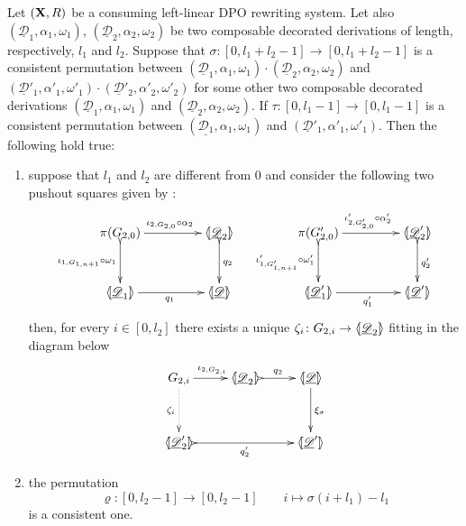 \documentclass[a4paper,UKenglish,cleveref,pdftex, thm-restate,numberwithinsect]{lipics}
\def\R{\mathsf{R}}
\def\X{\textbf {\textup{X}}}
\newcommand{\dder}[1]{\mathscr{#1}}
\newcommand{\der}[1]{\underline{\dder{#1}}}
\newcommand{\lpro}{\langle \hspace{-1.85pt}[}
\newcommand{\rpro}{]\hspace{-1.85pt}\rangle}
\newcommand{\tpro}[1]{\lpro \der{#1}\rpro}
\begin{document}
\begin{lemma}\label{lem:presuffix} Let $(\X, \R)$ be a consuming left-linear DPO rewriting system.  Let also $(\der{D}_1, \alpha_1, \omega_1)$, $(\der{D}_2, \alpha_2, \omega_2)$ be two composable decorated derivations of length, respectively, $l_1$ and $l_2$. Suppose that $\sigma\colon [0, l_1+l_2-1]\to [0, l_1+l_2-1]$ is a consistent permutation between $(\der{D}_1, \alpha_1, \omega_1)\cdot (\der{D}_2, \alpha_2, \omega_2)$ and $(\der{D}'_1, \alpha'_1, \omega'_1)\cdot (\der{D}'_2, \alpha'_2, \omega'_2)$ for some other two composable decorated derivations $(\der{D}_1, \alpha_1, \omega_1)$ and $(\der{D}_2, \alpha_2, \omega_2)$.  If $\tau\colon [0,l_1-1]\to [0, l_1-1]$ is a consistent permutation between $(\der{D_1}, \alpha_1, \omega_1)$ and $(\der{D}'_1, \alpha'_1, \omega'_1)$. Then the following hold true:
	\begin{enumerate}
		\item suppose that $l_1$ and $l_2$ are different from $0$ and consider the following two pushout squares given by :
		\[\xymatrix@C=45pt@R=30pt{\pi(G_{2,0}) \ar@{>->}[d]_{\iota_{1, G_{1,n+1}} \circ \omega_1}\ar[r]^{\iota_{2, G_{2,0}} \circ \alpha_2}& \lpro \der{D}_2 \rpro \ar@{>->}[d]^{q_2} &  \pi(G'_{2,0}) \ar@{>->}[d]_{\iota'_{1, G'_{1,n+1}} \circ \omega'_1} \ar[r]^{\iota'_{2, G'_{2,0}} \circ \alpha'_2}& \lpro \der{D}'_2 \rpro \ar@{>->}[d]^{q'_2} \\ \lpro \der{D}_1 \rpro  \ar[r]_{q_1} & \tpro{D} & \lpro \der{D}'_1\rpro \ar[r]_{q'_1} & \lpro \der{D}'\rpro  }\]
		then, for every $i\in [0, l_2]$ there exists a unique $\zeta_i\colon G_{2,i}\to \lpro \der{D}_2\rpro $ fitting in the diagram below
		\[\xymatrix@R=35pt{G_{2,i} \ar[r]^{\iota_{2,G_{2,i}}} \ar@{.>}[d]_{\zeta_i}&\lpro \der{D}_2 \rpro \ar@{>->}[r]^{q_2}& \tpro{D} \ar[d]^{\xi_{\sigma}} \\
			\lpro \der{D}'_2 \rpro \ar@{>->}[rr]_{q'_2}&& \lpro \der{D}'\rpro }\]
		\item the permutation
		\[\varrho\colon [0,l_2-1]\to [0, l_2-1] \qquad i \mapsto \sigma(i+l_1)-l_1\]
		is a consistent one.
	\end{enumerate}
\end{lemma}
\end{document}
